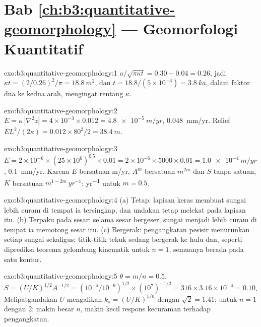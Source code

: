 \section*{Bab \ref{ch:b3:quantitative-geomorphology} --- Geomorfologi Kuantitatif}

\begin{solution}{exo:b3:quantitative-geomorphology:1}
$a/\sqrt{\pi\kappa t} = 0.30 - 0.04 = 0.26$, jadi $\kappa t = (2/0.26)^2/\pi =
\qty{18.8}{m^2}$, dan $t = 18.8/(5\times10^{-3}) = \qty{3.8}{ka}$, dalam
faktor dua ke kedua arah, mengingat rentang $\kappa$.
\end{solution}

\begin{solution}{exo:b3:quantitative-geomorphology:2}
$E = \kappa\,|\nabla^2 z| = 4\times10^{-3}\times0.012 =
\qty{4.8e-5}{m/yr}$, \qty{0.048}{mm/yr}. Relief $E L^2/(2\kappa) =
0.012\times80^2/2 = \qty{38.4}{m}$.
\end{solution}

\begin{solution}{exo:b3:quantitative-geomorphology:3}
$E = 2\times10^{-6}\times(25\times10^6)^{0.5}\times0.01 = 2\times10^{-6}
\times5000\times0.01 = \qty{1.0e-4}{m/yr}$, \qty{0.1}{mm/yr}. Karena $E$ bersatuan
\unit{m/yr}, $A^m$ bersatuan $\unit{m}^{2m}$ dan $S$ tanpa satuan, $K$ bersatuan
$\unit{m}^{1-2m}\,\unit{yr^{-1}}$: \unit{yr^{-1}} untuk $m = 0.5$.
\end{solution}

\begin{solution}{exo:b3:quantitative-geomorphology:4}
(a) Tetap: lapisan keras membuat sungai lebih curam di tempat ia tersingkap, dan undakan
tetap melekat pada lapisan itu. (b) Terpaku pada sesar: selama sesar bergeser,
sungai menjadi lebih curam di tempat ia memotong sesar itu. (c) Bergerak: pengangkatan
pesisir menurunkan  setiap sungai sekaligus; titik-titik tekuk
sedang bergerak ke hulu dan, seperti diprediksi teorema gelombang kinematik untuk $n
= 1$, semuanya berada pada satu kontur.
\end{solution}

\begin{solution}{exo:b3:quantitative-geomorphology:5}
$\theta = m/n = 0.5$. $S = (U/K)^{1/2}A^{-1/2} = (10^{-4}/10^{-9})^{1/2}
\times(10^7)^{-1/2} = 316\times3.16\times10^{-4} = 0.10$. Melipatgandakan $U$
mengalikan $k_s = (U/K)^{1/n}$ dengan $\sqrt2 = 1.41$; untuk $n = 1$ dengan 2:
makin besar $n$, makin kecil respons kecuraman terhadap pengangkatan.
\end{solution}


